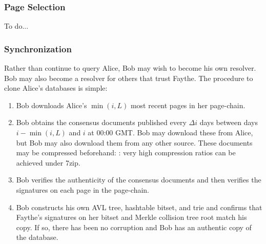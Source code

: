 
\subsubsection{Page Selection}

To do...

\subsubsection{Synchronization}
\label{sec:Synchronization}

Rather than continue to query Alice, Bob may wish to become his own resolver. Bob may also become a resolver for others that trust Faythe. The procedure to clone Alice's databases is simple:

\begin{enumerate}
	\item Bob downloads Alice's $ \min(i,L) $ most recent pages in her page-chain.
	\item Bob obtains the consensus documents published every $ \Delta i $ days between days $ i - \min(i,L) $ and $ i $ at 00:00 GMT. Bob may download these from Alice, but Bob may also download them from any other source. These documents may be compressed beforehand: : very high compression ratios can be achieved under 7zip.
	\item Bob verifies the authenticity of the consensus documents and then verifies the signatures on each page in the page-chain.
	\item Bob constructs his own AVL tree, hashtable bitset, and trie and confirms that Faythe's signatures on her bitset and Merkle collision tree root match his copy. If so, there has been no corruption and Bob has an authentic copy of the database.
\end{enumerate}


